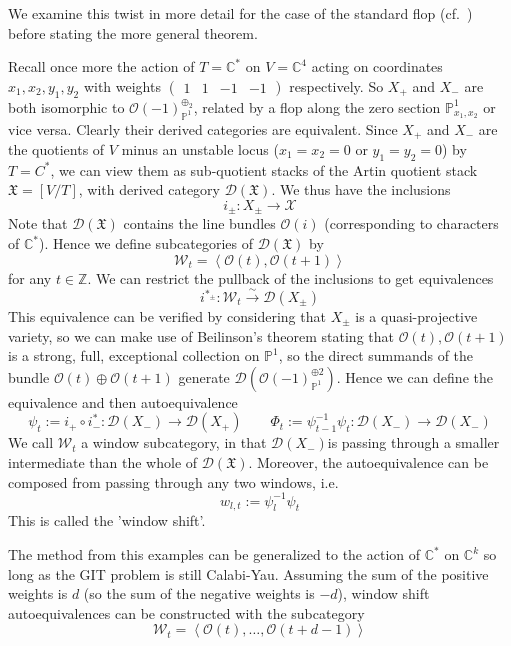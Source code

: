 We examine this twist in more detail for the case of the standard flop (cf.~\cite{donovan_window_2014}) before stating the more general theorem. 

Recall once more the action of $T = \mathbb{C}^*$ on $V = \mathbb{C}^4$  acting on coordinates $x_{1}, x_{2}, y_{1},y_{2}$ with weights $\begin{pmatrix}1&1&-1&-1\end{pmatrix}$ respectively. So $X_+$ and $X_-$ are both isomorphic to $\mathcal{O}(-1)_{\mathbb{P}^1}^{\oplus_{2}}$, related by a flop along the zero section $\mathbb{P}^1_{x_{1},x_{2}}$ or vice versa. Clearly their derived categories are equivalent. Since $X_+$ and $X_-$ are the quotients of $V$ minus an unstable locus ($x_{1}= x_{2}= 0$ or $y_{1}= y_{2}=0$)  by $T = C^{*}$, we can view them as sub-quotient stacks of the Artin quotient stack $\mathfrak{X}=[V/T]$, with derived category $\mathcal{D}(\mathfrak{X})$. We thus have the inclusions $$
i_{\pm}: X_{\pm}\to \mathcal{X}
$$
Note that $\mathcal{D}(\mathfrak{X})$ contains the line bundles $\mathcal{O}(i)$ (corresponding to characters of $\mathbb{C}^*$).  Hence we define subcategories of $\mathcal{D}(\mathfrak{X})$ by $$
 \mathcal{W}_{t}= \left< \mathcal{O}(t), \mathcal{O}(t+1) \right> 
$$ for any $t \in \mathbb{Z}$. We can restrict the pullback of the inclusions to get equivalences $$
i^{*_{\pm}}:\mathcal{W}_{t} \xrightarrow{\sim} \mathcal{D}(X_{\pm})
$$
This equivalence can be verified by considering that $X_\pm$ is a quasi-projective variety, so we can make use of Beilinson's theorem stating that $\mathcal{O}(t), \mathcal{O}(t+1)$ is a strong, full, exceptional collection on $\mathbb{P}^1$, so the direct summands of the bundle $\mathcal{O}(t)\oplus \mathcal{O}(t+1)$ generate  $\mathcal{D}(\mathcal{O}(-1)_{\mathbb{P}^{1}}^{\oplus {2}})$.  Hence we can define the equivalence and then autoequivalence $$
\psi_{t}:= i_{+}\circ i_{-}^{*}: \mathcal{D}(X_{-})\to \mathcal{D}(X_{+}) \qquad \Phi_{t}:= \psi_{t-1}^{-1}\psi_{t}: \mathcal{D}(X_{-})\to \mathcal{D}(X_{-})
$$
We call $\mathcal{W}_t$ a window subcategory, in that $\mathcal{D}(X_{-})$is passing through a smaller intermediate than the whole of $\mathcal{D}(\mathfrak{X})$. Moreover, the autoequivalence can be composed from passing through any two windows, i.e. $$
w_{l,t}:= \psi_{l}^{-1}\psi_t
$$
This is called the 'window shift'. 

\begin{remark}{}{}
	The method from this examples can be generalized to the action of $\mathbb{C}^*$ on $\mathbb{C}^k$ so long as the GIT problem is still Calabi-Yau. Assuming the sum of the positive weights is $d$ (so the sum of the negative weights is $-d$), window shift autoequivalences can be constructed with the subcategory $$\mathcal{W}_{t}= \left< \mathcal{O}(t),\dots, \mathcal{O}(t+d-1) \right> $$
\end{remark}


